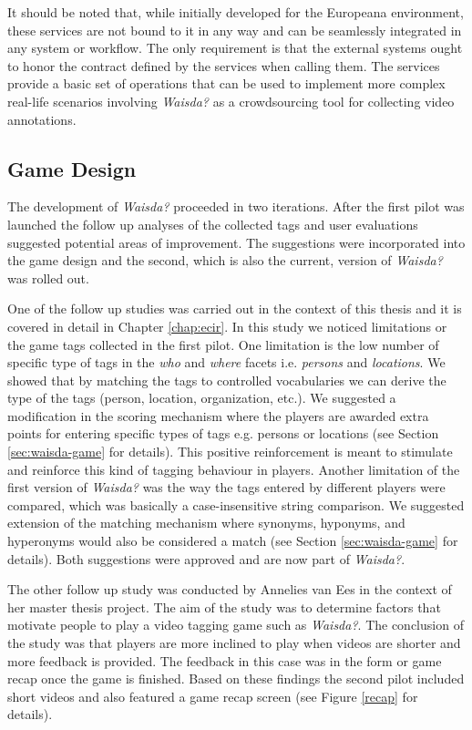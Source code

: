 It should be noted that, while initially developed for the Europeana environment, these services are not bound to it in any way and can be seamlessly integrated in any system or workflow. The only requirement is that the external systems ought to honor the contract defined by the services when calling them. The services provide a basic set of operations that can be used to implement more complex real-life scenarios involving \textit{Waisda?} as a crowdsourcing tool for collecting video annotations.

\subsection{Game Design}\label{chap:waisda:game-design}
The development of \textit{Waisda?} proceeded in two iterations. After the first pilot was launched the follow up analyses of the collected tags \cite{Annelies,ecir} and user evaluations suggested potential areas of improvement. The suggestions were incorporated into the game design and the second, which is also the current, version of \textit{Waisda?} was rolled out.

One of the follow up studies \cite{ecir} was carried out in the context of this thesis and it is covered in detail in Chapter \ref{chap:ecir}. In this study we noticed limitations or the game tags collected in the first pilot. One limitation is the low number of specific type of tags in the \textit{who} and \textit{where} facets i.e. \textit{persons} and \textit{locations}. We showed that by matching the tags to controlled vocabularies we can derive the type of the tags (person, location, organization, etc.). We suggested a modification in the scoring mechanism where the players are awarded extra points for entering specific types of tags e.g. persons or locations (see Section \ref{sec:waisda-game} for details). This positive reinforcement is meant to stimulate and reinforce this kind of tagging behaviour in players. Another limitation of the first version of \textit{Waisda?} was the way the tags entered by different players were compared, which was basically a case-insensitive string comparison. We suggested extension of the matching mechanism where synonyms, hyponyms, and hyperonyms would also be considered a match (see Section \ref{sec:waisda-game} for details). Both suggestions were approved and are now part of \textit{Waisda?}.

The other follow up study \cite{Annelies} was conducted by Annelies van Ees in the context of her master thesis project. The aim of the study was to determine factors that motivate people to play a video tagging game such as \textit{Waisda?}. The conclusion of the study was that players are more inclined to play when videos are shorter and more feedback is provided. The feedback in this case was in the form or game recap once the game is finished. Based on these findings the second pilot included short videos
and also featured a game recap screen (see Figure \ref{recap} for details).

